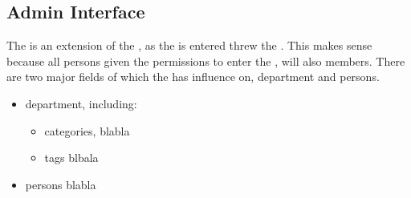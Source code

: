 \subsection{Admin Interface}
\label{sec:admininterface}

The \ainterface[] is an extension of the \sinterface[], as the \ainterface[] is entered threw the \sinterface[]. This makes sense because all persons given the permissions to enter the \ainterface[], will also \astaff[] members. There are two major fields of which the \admin[] has influence on, department and persons.

\begin{itemize}
	\item department, including:
	\begin{itemize}
		\item categories, blabla
		\item tags blbala
	\end{itemize}
	\item persons blabla
\end{itemize}